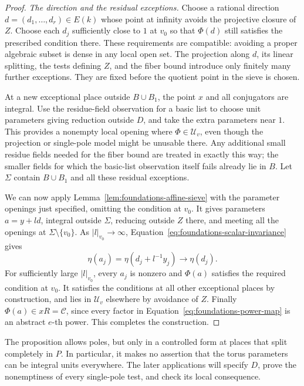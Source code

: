 \begin{proof}
\emph{The direction and the residual exceptions.}
Choose a rational direction \(d=(d_1,\ldots,d_r)\in E(k)\)
whose point at infinity avoids the projective closure of \(Z\).
Choose each \(d_j\) sufficiently close to \(1\) at \(v_0\) so that
\(\Phi(d)\) still satisfies the prescribed condition there.
These requirements are compatible: avoiding a proper algebraic
subset is dense in any local open set.
The projection along \(d\), its linear splitting, the tests defining
\(Z\), and the fiber bound introduce only finitely many further
exceptions.  They are fixed before the quotient point in the sieve
is chosen.

At a new exceptional place outside \(B\cup B_1\), the point \(x\)
and all conjugators are integral.  Use the residue-field observation
for a basic list to choose unit parameters giving reduction outside
\(D\), and take the extra parameters near \(1\).  This provides a
nonempty local opening where \(\Phi\in\mathcal U_v\), even though
the projection or single-pole model might be unusable there.
Any additional small residue fields needed for the fiber bound
are treated in exactly this way; the smaller fields for which the
basic-list observation itself fails already lie in \(B\).
Let \(\Sigma\) contain \(B\cup B_1\) and all these residual
exceptions.

We can now apply Lemma~\ref{lem:foundations-affine-sieve} with the
parameter openings just specified, omitting the condition at
\(v_0\).  It gives parameters \(a=y+ld\), integral outside
\(\Sigma\), reducing outside \(Z\) there, and meeting all the
openings at \(\Sigma\setminus\{v_0\}\).  As
\(|l|_{v_0}\to\infty\), Equation~\ref{eq:foundations-scalar-invariance}
gives
\[
 \eta(a_j)=\eta(d_j+l^{-1}y_j)\longrightarrow\eta(d_j).
\]
For sufficiently large \(|l|_{v_0}\), every \(a_j\) is nonzero and
\(\Phi(a)\) satisfies the required condition at \(v_0\).
It satisfies the conditions at all other exceptional places by
construction, and lies in \(\mathcal U_v\) elsewhere by avoidance
of \(Z\).  Finally \(\Phi(a)\in xR=\mathcal C\), since every factor
in Equation~\ref{eq:foundations-power-map} is an abstract \(e\)-th
power.  This completes the construction.
\end{proof}

The proposition allows poles, but only in a controlled form at places
that split completely in \(P\).  In particular, it makes no assertion
that the torus parameters can be integral units everywhere.
The later applications will specify \(D\), prove the nonemptiness
of every single-pole test, and check its local consequence.

